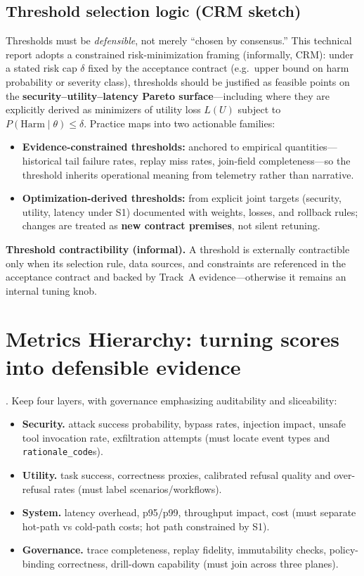 \documentclass[11pt,a4paper]{report}
\begin{document}
\subsection{Threshold selection logic (CRM sketch)}
Thresholds must be \emph{defensible}, not merely ``chosen by consensus.'' This technical report adopts a constrained risk-minimization framing (informally, CRM): under a stated risk cap $\delta$ fixed by the acceptance contract (e.g.\ upper bound on harm probability or severity class), thresholds should be justified as feasible points on the \textbf{security--utility--latency Pareto surface}---including where they are explicitly derived as minimizers of utility loss $L(U)$ subject to $P(\mathrm{Harm}\mid \theta)\le \delta$. Practice maps into two actionable families:
\begin{itemize}
  \item \textbf{Evidence-constrained thresholds:} anchored to empirical quantities---historical tail failure rates, replay miss rates, join-field completeness---so the threshold inherits operational meaning from telemetry rather than narrative.
  \item \textbf{Optimization-derived thresholds:} from explicit joint targets (security, utility, latency under S1) documented with weights, losses, and rollback rules; changes are treated as \textbf{new contract premises}, not silent retuning.
\end{itemize}
\noindent\textbf{Threshold contractibility (informal).} A threshold is externally contractible only when its selection rule, data sources, and constraints are referenced in the acceptance contract and backed by Track~A evidence---otherwise it remains an internal tuning knob.

\section{Metrics Hierarchy: turning scores into defensible evidence}
\EvalFramework{}. Keep four layers, with governance emphasizing auditability and sliceability:
\begin{itemize}
  \item \textbf{Security.} attack success probability, bypass rates, injection impact, unsafe tool invocation rate, exfiltration attempts (must locate event types and \texttt{rationale\_code}s).
  \item \textbf{Utility.} task success, correctness proxies, calibrated refusal quality and over-refusal rates (must label scenarios/workflows).
  \item \textbf{System.} latency overhead, p95/p99, throughput impact, cost (must separate hot-path vs cold-path costs; hot path constrained by S1).
  \item \textbf{Governance.} trace completeness, replay fidelity, immutability checks, policy-binding correctness, drill-down capability (must join across three planes).
\end{itemize}
\end{document}
